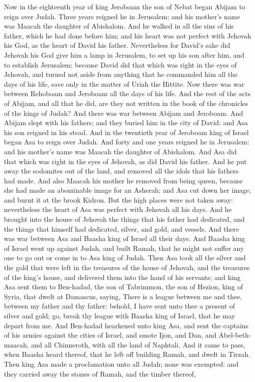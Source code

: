 Now in the eighteenth year of king Jeroboam the son of Nebat began Abijam to reign over Judah. Three years reigned he in Jerusalem: and his mother’s name was Maacah the daughter of Abishalom. And he walked in all the sins of his father, which he had done before him; and his heart was not perfect with Jehovah his God, as the heart of David his father. Nevertheless for David’s sake did Jehovah his God give him a lamp in Jerusalem, to set up his son after him, and to establish Jerusalem; because David did that which was right in the eyes of Jehovah, and turned not aside from anything that he commanded him all the days of his life, save only in the matter of Uriah the Hittite. Now there was war between Rehoboam and Jeroboam all the days of his life.  And the rest of the acts of Abijam, and all that he did, are they not written in the book of the chronicles of the kings of Judah? And there was war between Abijam and Jeroboam. And Abijam slept with his fathers; and they buried him in the city of David: and Asa his son reigned in his stead.  And in the twentieth year of Jeroboam king of Israel began Asa to reign over Judah. And forty and one years reigned he in Jerusalem: and his mother’s name was Maacah the daughter of Abishalom. And Asa did that which was right in the eyes of Jehovah, as did David his father. And he put away the sodomites out of the land, and removed all the idols that his fathers had made. And also Maacah his mother he removed from being queen, because she had made an abominable image for an Asherah; and Asa cut down her image, and burnt it at the brook Kidron. But the high places were not taken away: nevertheless the heart of Asa was perfect with Jehovah all his days. And he brought into the house of Jehovah the things that his father had dedicated, and the things that himself had dedicated, silver, and gold, and vessels.  And there was war between Asa and Baasha king of Israel all their days. And Baasha king of Israel went up against Judah, and built Ramah, that he might not suffer any one to go out or come in to Asa king of Judah. Then Asa took all the silver and the gold that were left in the treasures of the house of Jehovah, and the treasures of the king’s house, and delivered them into the hand of his servants; and king Asa sent them to Ben-hadad, the son of Tabrimmon, the son of Hezion, king of Syria, that dwelt at Damascus, saying, There is a league between me and thee, between my father and thy father: behold, I have sent unto thee a present of silver and gold; go, break thy league with Baasha king of Israel, that he may depart from me. And Ben-hadad hearkened unto king Asa, and sent the captains of his armies against the cities of Israel, and smote Ijon, and Dan, and Abel-beth-maacah, and all Chinneroth, with all the land of Naphtali. And it came to pass, when Baasha heard thereof, that he left off building Ramah, and dwelt in Tirzah. Then king Asa made a proclamation unto all Judah; none was exempted: and they carried away the stones of Ramah, and the timber thereof, 